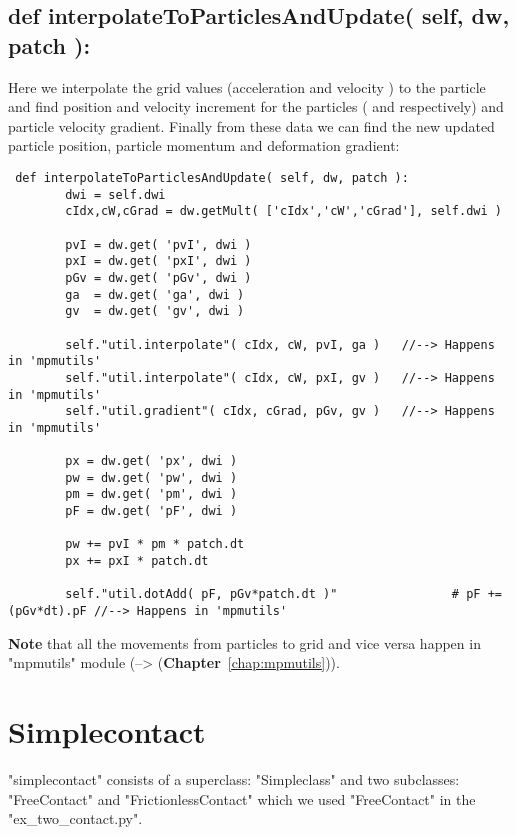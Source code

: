 \documentclass[11pt,fleqn]{book} %
\begin{document}
\section{ def interpolateToParticlesAndUpdate( self, dw, patch ): }
Here we interpolate the grid values (acceleration  and velocity ) to the particle and find position and velocity increment for the particles ( and  respectively) and particle velocity gradient. Finally from these data we can find the new updated particle position, particle momentum and deformation gradient:

\begin{lstlisting}
 def interpolateToParticlesAndUpdate( self, dw, patch ):         
        dwi = self.dwi
        cIdx,cW,cGrad = dw.getMult( ['cIdx','cW','cGrad'], self.dwi )

        pvI = dw.get( 'pvI', dwi )
        pxI = dw.get( 'pxI', dwi )
        pGv = dw.get( 'pGv', dwi )
        ga  = dw.get( 'ga', dwi )
        gv  = dw.get( 'gv', dwi )
        
        self."util.interpolate"( cIdx, cW, pvI, ga )   //--> Happens in 'mpmutils'
        self."util.interpolate"( cIdx, cW, pxI, gv )   //--> Happens in 'mpmutils'
        self."util.gradient"( cIdx, cGrad, pGv, gv )   //--> Happens in 'mpmutils'
        
        px = dw.get( 'px', dwi )
        pw = dw.get( 'pw', dwi )
        pm = dw.get( 'pm', dwi )        
        pF = dw.get( 'pF', dwi )
        
        pw += pvI * pm * patch.dt
        px += pxI * patch.dt
        
        self."util.dotAdd( pF, pGv*patch.dt )"                # pF += (pGv*dt).pF //--> Happens in 'mpmutils'
\end{lstlisting}

\textbf{Note} that all the movements from particles to grid and vice versa happen in "mpmutils" module (--> (\textbf{Chapter}~\ref{chap:mpmutils})).




\chapter{Simplecontact}
\label{chap:simplecontact}
"simplecontact" consists of a superclass: "Simpleclass" and two subclasses: "FreeContact" and "FrictionlessContact" which we used "FreeContact" in the "ex\_two\_contact.py".
\end{document}
